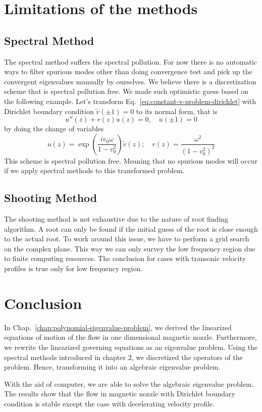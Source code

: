 \section{Limitations of the methods}
\subsection{Spectral Method}
The spectral method suffers the spectral pollution. For now there is no automatic ways to filter spurious modes other than doing convergence test and pick up the convergent eigenvalues manually by ourselves. We believe there is a discretization scheme that is spectral pollution free. We made such optimistic guess based on the following example. Let's transform Eq.~\ref{eq:constant-v-problem-dirichlet} with Dirichlet boundary condition $\tilde{v}(\pm 1) = 0$ to its normal form, that is
\begin{equation}
	u''(z) + r(z)u(z) = 0, \quad u(\pm 1) = 0
\end{equation}
by doing the change of variables
\begin{equation}
	u(z) = \exp\left(\frac{iv_0\omega}{1-v_0^2}\right)\tilde{v}(z); \quad
	r(z) = \frac{\omega^2}{(1-v_0^2)^2}
\end{equation}
This scheme is spectral pollution free. Meaning that no spurious modes will occur if we apply spectral methods to this transformed problem.


\subsection{Shooting Method}
The shooting method is not exhaustive due to the nature of root finding algorithm. A root can only be found if the initial guess of the root is close enough to the actual root. To work around this issue, we have to perform a grid search on the complex plane. This way we can only survey the low frequency region due to finite computing resources. The conclusion for cases with transonic velocity profiles is true only for low frequency region.

\section{Conclusion}
In Chap.~\ref{chap:polynomial-eigenvalue-problem}, we derived the linearized equations of motion of the flow in one dimensional magnetic nozzle. Furthermore, we rewrite the linearized governing equations as an eigenvalue problem. Using the spectral methods introduced in chapter 2, we discretized the operators of the problem. Hence, transforming it into an algebraic eigenvalue problem.

With the aid of computer, we are able to solve the algebraic eigenvalue problem. The results show that the flow in magnetic nozzle with Dirichlet boundary condition is stable except the case with decelerating velocity profile.
